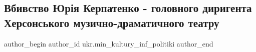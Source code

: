  
 
 
 
 
 
\subsection{Вбивство Юрія Керпатенко - головного диригента Херсонського музично-драматичного театру}
\label{sec:15_10_2022.fb.ukr.min_kultury_inf_politiki.1.kerpatenko_murder}
 
\ifcmt
 author_begin
   author_id ukr.min_kultury_inf_politiki
 author_end
\fi
